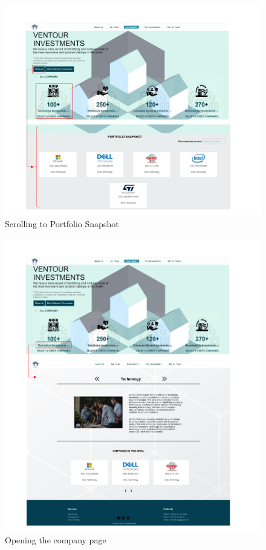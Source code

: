 \documentclass[../../DD.tex]{subfiles}
\begin{document}
   \begin{figure}[!htb]
       \centering
       \includegraphics[width=\textwidth]{Images/scenarios/scenario investments2.png}
       \caption{Scrolling to Portfolio Snapshot}
       \label{fig:scen1-2}
   \end{figure}

\begin{figure}[!htb]
       \centering
       \includegraphics[width=\textwidth]{Images/scenarios/scenario investments3.png}
       \caption{Opening the company page}
       \label{fig:scen1-3}
   \end{figure}
\end{document}
